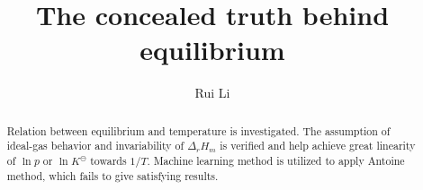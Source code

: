 \documentclass[%
 reprint,
 amsmath,amssymb,
 aps,
10.5pt,
]{revtex4-1}
\begin{document}

\title{The concealed truth behind equilibrium}%

\author{Rui Li}
%





\begin{abstract}
Relation between equilibrium and temperature is investigated. The assumption of ideal-gas behavior and invariability of $\Delta_rH_m$ is verified and help achieve great linearity of $\ln{p}$ or $\ln{K^\ominus}$ towards $1/T$. Machine learning method is utilized to apply Antoine method, which fails to give satisfying results.
\end{abstract}

\maketitle

\tableofcontents
\end{document}
